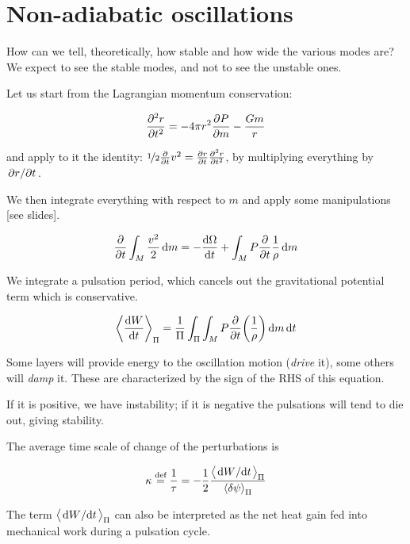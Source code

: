 \documentclass[main.tex]{subfiles}
\begin{document}
\section{Non-adiabatic oscillations}

How can we tell, theoretically, how stable and how wide the various modes are?
We expect to see the stable modes, and not to see the unstable ones.

Let us start from the Lagrangian momentum conservation:

\begin{equation}
    \pdv[2]{r}{t} = - 4 \pi r^2 \pdv{P}{m} - \frac{Gm}{r}
\end{equation}

and apply to it the identity: \(\frac[i]{1}{2} \pdv{}{t} v^2 = \pdv{r}{t} \pdv[2]{r}{t}\), by multiplying everything by \(\pdv*{r}{t} \).

We then integrate everything with respect to \(m\) and apply some manipulations [see slides].

\begin{equation}
  \pdv{}{t} \int_M \frac{v^2}{2} \dd{m} =
  - \dv{\Omega}{t} + \int_M P \pdv{}{t} \frac{1}{\rho} \dd{m}
\end{equation}

We integrate a pulsation period, which cancels out the gravitational potential term which is conservative.

\begin{equation}
  \expval{\dv{W}{t}}_\Pi = \frac{1}{\Pi} \int_\Pi \int_M   P \pdv{}{t} \qty(\frac{1}{\rho}) \dd{m} \dd{t}
\end{equation}

Some layers will provide energy to the oscillation motion (\emph{drive} it), some others will \emph{damp} it.
These are characterized by the sign of the RHS of this equation.

If it is positive, we have instability; if it is negative the pulsations will tend to die out, giving stability.

The average time scale of change of the perturbations is

\begin{equation}
  \kappa \defeq \frac{1}{\tau} = -\frac{1}{2} \frac{\expval{\dv*{W}{t}}_\Pi}{\expval{ \delta \psi}_\Pi }
\end{equation}

The term \(\expval{\dv*{W}{t}}_\Pi \) can also be interpreted as the net heat gain fed into mechanical work during a pulsation cycle.
\end{document}
